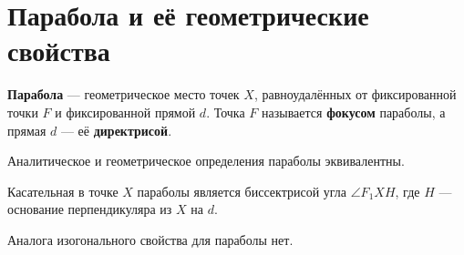 \section{Парабола и её геометрические свойства}

\begin{definition}
    \textbf{Парабола} --- геометрическое место точек $X$, равноудалённых от фиксированной точки $F$ и фиксированной прямой $d$. Точка $F$ называется \textbf{фокусом} параболы, а прямая $d$ --- её \textbf{директрисой}.
\end{definition}

\begin{statement}
    Аналитическое и геометрическое определения параболы эквивалентны.
\end{statement}

\begin{theorem}
    Касательная в точке $X$ параболы является биссектрисой угла $\angle F_1XH$, где $H$ --- основание перпендикуляра из $X$ на $d$.
\end{theorem}

\begin{orangebox}
    Аналога изогонального свойства для параболы нет.
\end{orangebox}

